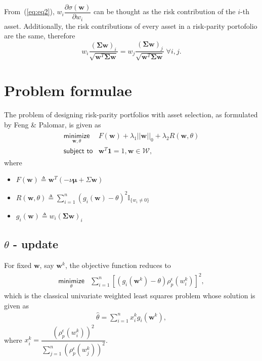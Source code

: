 \documentclass{article}
\begin{document}
From~(\ref{eq:eq2}), $w_{i}\dfrac{\partial \sigma(\bm{w})}{\partial w_i}$ can be
thought as the risk contribution of the $i$-th asset. Additionally, the risk
contributions of every asset in a risk-parity portofolio are the same, therefore
\begin{equation}
w_i \dfrac{(\bm{\Sigma}{\bm{w}})_{i}}{\sqrt{\bm{w}^{T}\bm{\Sigma}\bm{w}}} =
w_j \dfrac{(\bm{\Sigma}{\bm{w}})_{j}}{\sqrt{\bm{w}^{T}\bm{\Sigma}\bm{w}}}~\forall i, j.
\end{equation}

\section{Problem formulae}
The problem of designing risk-parity portfolios with asset selection, as formulated by Feng \& Palomar,
is given as
\begin{align}\begin{array}{ll}
\underset{\bm{w}, \theta}{\textsf{minimize}} & F(\bm{w}) + \lambda_{1}||\bm{w}||_{0} + \lambda_{2}R(\bm{w}, \theta)\\
\textsf{subject to} & \bm{w}^{T}\bm{1} = 1, \bm{w} \in \mathcal{W},
\end{array}\end{align}
where
\begin{itemize}
    \item $F(\bm{w}) \triangleq \bm{w}^{T}(- \nu \bm{\mu} + \Sigma\bm{w})$
    \item $R(\bm{w}, \theta) \triangleq \sum_{i=1}^{n}(g_i(\bm{w}) - \theta)^{2}\mathbb{I}_{\{w_i \neq 0\}}$
    \item $g_i(\bm{w}) \triangleq w_i\left(\bm{\Sigma}\bm{w}\right)_{i}$
\end{itemize}

\subsection{$\theta$ - update}
For fixed $\bm{w}$, say $\bm{w}^{k}$, the objective function reduces to
\begin{align}\begin{array}{ll}
\underset{\theta}{\textsf{minimize}} & \sum_{i=1}^{n}\left[\left(g_i(\bm{w}^{k}) -
                                       \theta\right)\rho^{\epsilon}_{p}\left(w^{k}_{i}\right)\right]^2,
\end{array}\end{align}
which is the classical univariate weighted least squares problem whose solution is given as
\begin{align}
\hat{\theta} = \sum_{i=1}^{n}x^{k}_{i}g_{i}\left(\bm{w}^{k}\right),
\end{align}
where $x^{k}_{i} = \dfrac{\left(\rho^{\epsilon}_p\left(w^{k}_i\right)\right)^{2}}
                  {\sum^{n}_{j = 1}\left(\rho^{\epsilon}_{p}\left(w^{k}_j\right)\right)^{2}}$.
\end{document}
